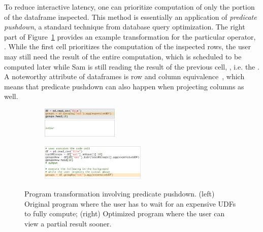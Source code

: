 To reduce interactive latency, one can prioritize computation of only the portion of the dataframe inspected.  This method is essentially an application of \textit{predicate pushdown}, a standard technique from database query optimization.
The right part of Figure~\ref{fig:partial} provides an example transformation for the particular operator, .
While the first cell prioritizes the computation of the inspected rows, the user may still need the result of the entire computation, which is scheduled to be computed later while Sam is still reading the result of the previous cell, , i.e. the \thinktime.
A noteworthy attribute of dataframes is row and column equivalence~\cite{petersohn13towards}, which means that
predicate pushdown can also happen when projecting columns as well.

\begin{figure}[h!]
     \centering
     \begin{subfigure}%
         \centering
         \includegraphics[width=0.4\textwidth]{submissions/interactivity/figures/predOrig.pdf}
     \end{subfigure}
     \hfill
     \begin{subfigure}%
         \centering
         \includegraphics[width=0.55\textwidth]{submissions/interactivity/figures/predOpt.pdf}
     \end{subfigure}
        \caption{Program transformation involving predicate pushdown. (left) Original program where the user has to wait for an expensive UDFs to fully compute; (right) Optimized program where the user can view a partial result sooner.
        }
        \label{fig:partial}
\end{figure}
